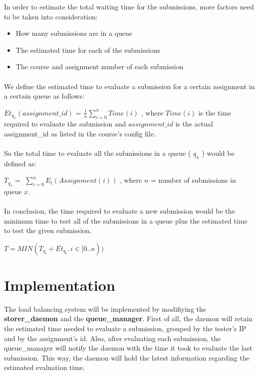 In order to estimate the total waiting time for the submissions, more factors
need to be taken into consideration:
\begin{itemize}
\item How many submissions are in a queue
\item The estimated time for each of the submissions
\item The course and assignment number of each submission 
\end{itemize}

\paragraph{}

We define the estimated time to evaluate a submission for a certain assignment in 
a certain queue as follows:

$ Et_{q_x}( assignment\_id) $ = $\frac{1}{n} \displaystyle\sum\limits_{i=0}^{n} Time(i)$ , where
$ Time(i) $ is the time required to evaluate the submission and $assignment\_id$ is the actual 
assignment_id as listed in the course's config file.

\paragraph{}

So the total time to evaluate all the submissions in a queue ( $ q_x $ ) would be defined as:

$ T_{ q_x} = $ $\displaystyle\sum\limits_{i=0}^{n} E_t(Assignment(i))$ , where $ n $ = number of submissions in  queue $  x $.

\paragraph{}

In conclusion, the time required to evaluate a new submission would be the minimum time
to test all of the submissions in a queue plus the estimated time to test the given
submission.

$ T = MIN( T_{q_i} + Et_{q_i}, i \in [0..n) ) $


\section{Implementation}
\label{sec:vmc-load-impl}

The load balancing system will be implemented by modifiying the {\bf storer_daemon}
and the {\bf queue_manager}. First of all, the daemon will retain the estimated
time needed to evaluate a submission, grouped by the tester's IP and by
the assignment's id. Also, after evaluating each submission, the queue_manager
will notify the daemon with the time it took to evaluate the last submission.
This way, the daemon will hold the latest information regarding the estimated
evaluation time.




